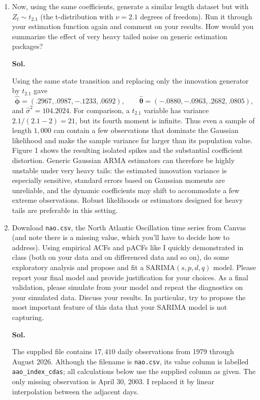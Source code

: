 \documentclass[lang=en,11pt,a4paper,citestyle =authoryear]{elegantpaper}
\begin{document}
\begin{enumerate}[label=\arabic*.,leftmargin=*]
\item Now, using the same coefficients, generate a similar length dataset but with $Z_t\sim t_{2.1}$ (the t-distribution with $\nu=2.1$ degrees of freedom). Run it through your estimation function again and comment on your results. How would you summarize the effect of very heavy tailed noise on generic estimation packages?
\par\vspace{0.5em}\textbf{Sol.}\par
Using the same state transition and replacing only the innovation generator by
$t_{2.1}$ gave
\[
\widehat{\boldsymbol\phi}=(.2967,.0987,-.1233,.0692),
\qquad
\widehat{\boldsymbol\theta}=(-.0880,-.0963,.2682,.0805),
\]
and $\widehat\sigma^2=104.2024$. For comparison, a $t_{2.1}$ variable has
variance $2.1/(2.1-2)=21$, but its fourth moment is infinite. Thus even a
sample of length $1{,}000$ can contain a few observations that dominate the
Gaussian likelihood and make the sample variance far larger than its
population value. Figure 1 shows the resulting isolated spikes and the
substantial coefficient distortion. Generic Gaussian ARMA estimators can
therefore be highly unstable under very heavy tails: the estimated innovation
variance is especially sensitive, standard errors based on Gaussian moments
are unreliable, and the dynamic coefficients may shift to accommodate a few
extreme observations. Robust likelihoods or estimators designed for heavy
tails are preferable in this setting.
\vspace{1em}

\item Download \texttt{nao.csv}, the North Atlantic Oscillation time series from Canvas (and note there is a missing value, which you'll have to decide how to address). Using empirical ACFs and pACFs like I quickly demonstrated in class (both on your data and on differenced data and so on), do some exploratory analysis and propose and fit a SARIMA$(s,p,d,q)$ model. Please report your final model and provide justification for your choices. As a final validation, please simulate from your model and repeat the diagnostics on your simulated data. Discuss your results. In particular, try to propose the most important feature of this data that your SARIMA model is not capturing.
\par\vspace{0.5em}\textbf{Sol.}\par
The supplied file contains $17{,}410$ daily observations from 1979 through
August 2026. Although the filename is \texttt{nao.csv}, its value column is
labelled \texttt{aao\_index\_cdas}; all calculations below use the supplied
column as given. The only missing observation is April 30, 2003. I replaced it
by linear interpolation between the adjacent days.


\end{enumerate}
\end{document}
